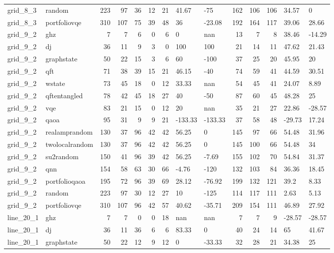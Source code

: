 \begin{longtable}{llrrrrrllrrrll}
grid\_8\_3 & random & 223 & 97 & 36 & 12 & 21 & 41.67 & -75 & 162 & 106 & 106 & 34.57 & 0 \\
grid\_8\_3 & portfoliovqe & 310 & 107 & 75 & 39 & 48 & 36 & -23.08 & 192 & 164 & 117 & 39.06 & 28.66 \\
grid\_9\_2 & ghz & 7 & 7 & 6 & 0 & 6 & 0 & nan & 13 & 7 & 8 & 38.46 & -14.29 \\
grid\_9\_2 & dj & 36 & 11 & 9 & 3 & 0 & 100 & 100 & 21 & 14 & 11 & 47.62 & 21.43 \\
grid\_9\_2 & graphstate & 50 & 22 & 15 & 3 & 6 & 60 & -100 & 37 & 25 & 20 & 45.95 & 20 \\
grid\_9\_2 & qft & 71 & 38 & 39 & 15 & 21 & 46.15 & -40 & 74 & 59 & 41 & 44.59 & 30.51 \\
grid\_9\_2 & wstate & 73 & 45 & 18 & 0 & 12 & 33.33 & nan & 54 & 45 & 41 & 24.07 & 8.89 \\
grid\_9\_2 & qftentangled & 78 & 42 & 45 & 18 & 27 & 40 & -50 & 87 & 60 & 45 & 48.28 & 25 \\
grid\_9\_2 & vqe & 83 & 21 & 15 & 0 & 12 & 20 & nan & 35 & 21 & 27 & 22.86 & -28.57 \\
grid\_9\_2 & qaoa & 95 & 31 & 9 & 9 & 21 & -133.33 & -133.33 & 37 & 58 & 48 & -29.73 & 17.24 \\
grid\_9\_2 & realamprandom & 130 & 37 & 96 & 42 & 42 & 56.25 & 0 & 145 & 97 & 66 & 54.48 & 31.96 \\
grid\_9\_2 & twolocalrandom & 130 & 37 & 96 & 42 & 42 & 56.25 & 0 & 145 & 100 & 66 & 54.48 & 34 \\
grid\_9\_2 & su2random & 150 & 41 & 96 & 39 & 42 & 56.25 & -7.69 & 155 & 102 & 70 & 54.84 & 31.37 \\
grid\_9\_2 & qnn & 154 & 58 & 63 & 30 & 66 & -4.76 & -120 & 132 & 103 & 84 & 36.36 & 18.45 \\
grid\_9\_2 & portfolioqaoa & 195 & 72 & 96 & 39 & 69 & 28.12 & -76.92 & 199 & 132 & 121 & 39.2 & 8.33 \\
grid\_9\_2 & random & 223 & 97 & 30 & 12 & 27 & 10 & -125 & 114 & 117 & 111 & 2.63 & 5.13 \\
grid\_9\_2 & portfoliovqe & 310 & 107 & 96 & 42 & 57 & 40.62 & -35.71 & 209 & 154 & 111 & 46.89 & 27.92 \\
line\_20\_1 & ghz & 7 & 7 & 0 & 0 & 18 & nan & nan & 7 & 7 & 9 & -28.57 & -28.57 \\
line\_20\_1 & dj & 36 & 11 & 36 & 6 & 6 & 83.33 & 0 & 40 & 24 & 14 & 65 & 41.67 \\
line\_20\_1 & graphstate & 50 & 22 & 12 & 9 & 12 & 0 & -33.33 & 32 & 28 & 21 & 34.38 & 25 \\

\end{longtable}

